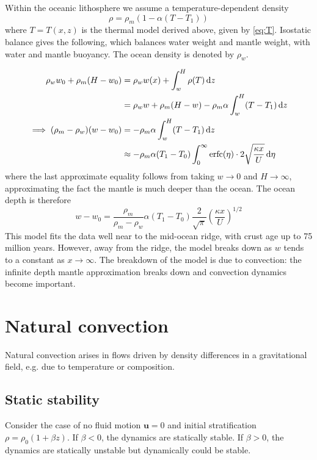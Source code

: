 \documentclass{jknotes}
\begin{document}
Within the oceanic lithosphere we assume a temperature-dependent density
\begin{equation}
	\rho = \rho_m \left( 1- \alpha (T - T_1)\right)
\end{equation}
where $T=T(x,z)$ is the thermal model derived above, given by \eqref{eq:T}.
Isostatic balance gives the following, which balances water weight and mantle
weight, with water and mantle buoyancy. The ocean density is denoted by
$\rho_w$.

\begin{align}
	\rho_w w_0 + \rho_m (H - w_0) &= \rho_w w(x) + \int_w^H \rho(T) \, \diffd
	z \\
	  &= \rho_w w + \rho_m (H-w) - \rho_m \alpha \int_w^H (T-T_1) \, \diffd z \\
	\implies (\rho_m - \rho_w)(w-w_0) &= - \rho_m \alpha \int_w^H (T-T_1) \,
	\diffd z \\
	&\approx  - \rho_m \alpha (T_1 - T_0) \int_0^\infty \text{erfc}(\eta)
	\cdot 2 \sqrt{\frac{\kappa x}{U}} \, \diffd \eta
\end{align}
where the last approximate equality follows from taking $w \to 0$ and $H \to
\infty$, approximating the fact the mantle is much deeper than the ocean. The
ocean depth is therefore
\begin{equation}
	w-w_0 = \frac{\rho_m}{\rho_m - \rho_w} \alpha (T_1-T_0)
	\frac{2}{\sqrt{\pi}} \left(\frac{\kappa x}{U}\right)^{1/2}
\end{equation}
This model fits the data well near to the mid-ocean ridge, with crust age up
to 75 million years. However, away from the ridge, the model breaks down as
$w$ tends to a constant as $x \to \infty$. The breakdown of the model is due
to convection: the infinite depth mantle approximation breaks down and
convection dynamics become important.

\section{Natural convection}
Natural convection arises in flows driven by density differences in a
gravitational field, e.g. due to temperature or composition.

\subsection{Static stability}
Consider the case of no fluid motion $\symbf{u} = 0$ and initial
stratification $\rho = \rho_0 (1+\beta z)$.  If $\beta < 0$, the dynamics are
statically stable. If $\beta > 0$, the dynamics are statically unstable but
dynamically could be stable. 
\end{document}
